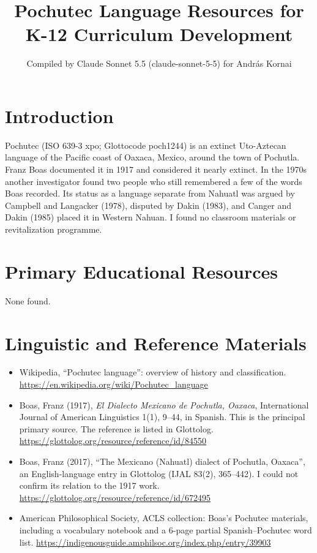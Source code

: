 \documentclass[12pt]{article}
\title{Pochutec Language Resources for K-12 Curriculum Development}
\author{Compiled by Claude Sonnet 5.5 (claude-sonnet-5-5) for Andr\'as Kornai}
\date{}
\begin{document}
\maketitle

\section{Introduction}
Pochutec (ISO 639-3 xpo; Glottocode poch1244) is an extinct Uto-Aztecan language of the Pacific coast of Oaxaca, Mexico, around the town of Pochutla. Franz Boas documented it in 1917 and considered it nearly extinct. In the 1970s another investigator found two people who still remembered a few of the words Boas recorded. Its status as a language separate from Nahuatl was argued by Campbell and Langacker (1978), disputed by Dakin (1983), and Canger and Dakin (1985) placed it in Western Nahuan. I found no classroom materials or revitalization programme.

\section{Primary Educational Resources}
None found.

\section{Linguistic and Reference Materials}
\begin{itemize}
\item Wikipedia, ``Pochutec language'': overview of history and classification. \url{https://en.wikipedia.org/wiki/Pochutec_language}
\item Boas, Franz (1917), \emph{El Dialecto Mexicano de Pochutla, Oaxaca}, International Journal of American Linguistics 1(1), 9--44, in Spanish. This is the principal primary source. The reference is listed in Glottolog. \url{https://glottolog.org/resource/reference/id/84550}
\item Boas, Franz (2017), ``The Mexicano (Nahuatl) dialect of Pochutla, Oaxaca'', an English-language entry in Glottolog (IJAL 83(2), 365--442). I could not confirm its relation to the 1917 work. \url{https://glottolog.org/resource/reference/id/672495}
\item American Philosophical Society, ACLS collection: Boas's Pochutec materials, including a vocabulary notebook and a 6-page partial Spanish--Pochutec word list. \url{https://indigenousguide.amphilsoc.org/index.php/entry/39903}
\end{itemize}
\end{document}
